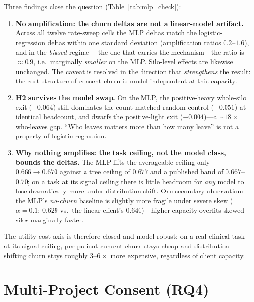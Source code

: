 \documentclass[12pt]{report}
\begin{document}
Three findings close the question (Table~\ref{tab:mlp_check}):

\begin{enumerate}
  \item \textbf{No amplification: the churn deltas are not a linear-model
        artifact.} Across all twelve rate-sweep cells the MLP deltas match the
        logistic-regression deltas within one standard deviation
        (amplification ratios $0.2$--$1.6$), and in the \emph{biased} regime---
        the one that carries the mechanism---the ratio is $\approx 0.9$, i.e.\
        marginally \emph{smaller} on the MLP. Silo-level effects are likewise
        unchanged. The caveat is resolved in the direction that
        \emph{strengthens} the result: the cost structure of consent churn is
        model-independent at this capacity.
  \item \textbf{H2 survives the model swap.} On the MLP, the positive-heavy
        whole-silo exit ($-0.064$) still dominates the count-matched random
        control ($-0.051$) at identical headcount, and dwarfs the
        positive-light exit ($-0.004$)---a ${\sim}18\times$ who-leaves gap.
        ``Who leaves matters more than how many leave'' is not a property of
        logistic regression.
  \item \textbf{Why nothing amplifies: the task ceiling, not the model class,
        bounds the deltas.} The MLP lifts the averageable ceiling only
        $0.666 \rightarrow 0.670$ against a tree ceiling of $0.677$ and a
        published band of $0.667$--$0.70$; on a task at its signal ceiling there
        is little headroom for \emph{any} model to lose dramatically more under
        distribution shift. One secondary observation: the MLP's \emph{no-churn}
        baseline is slightly more fragile under severe skew
        ($\alpha{=}0.1$: $0.629$ vs.\ the linear client's $0.640$)---higher
        capacity overfits skewed silos marginally faster.
\end{enumerate}

The utility-cost axis is therefore closed and model-robust: on a real clinical
task at its signal ceiling, per-patient consent churn stays cheap and
distribution-shifting churn stays roughly $3$--$6\times$ more expensive,
regardless of client capacity.

\section{Multi-Project Consent (RQ4)}
\label{sec:multiproject}
\end{document}
